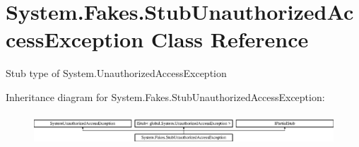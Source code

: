 \hypertarget{class_system_1_1_fakes_1_1_stub_unauthorized_access_exception}{\section{System.\-Fakes.\-Stub\-Unauthorized\-Access\-Exception Class Reference}
\label{class_system_1_1_fakes_1_1_stub_unauthorized_access_exception}
}


Stub type of System.\-Unauthorized\-Access\-Exception 


Inheritance diagram for System.\-Fakes.\-Stub\-Unauthorized\-Access\-Exception\-:\begin{figure}[H]
\begin{center}
\leavevmode
\includegraphics[height=1.148718cm]{class_system_1_1_fakes_1_1_stub_unauthorized_access_exception}
\end{center}
\end{figure}

